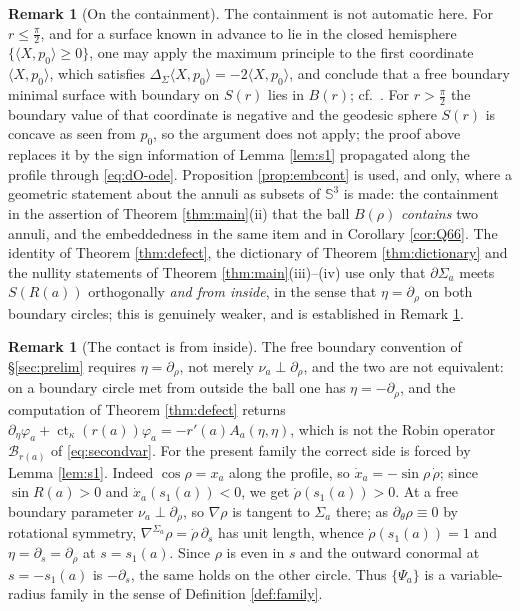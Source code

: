 \documentclass[11pt,a4paper]{amsart}
\theoremstyle{plain}
\theoremstyle{definition}
\newtheorem{remark}[theorem]{Remark}
\newcommand{\Sph}{\mathbb{S}}
\newcommand{\ct}{\operatorname{ct}_\kappa}
\begin{document}
\begin{remark}[On the containment]\label{rem:constrained}
The containment is not automatic here. For $r\leq\tfrac\pi2$, and for a surface known in advance to lie in the closed
hemisphere $\{\langle X,p_0\rangle\geq 0\}$, one may apply the maximum principle to the first coordinate $\langle X,p_0\rangle$, which satisfies $\Delta_{\Sigma}\langle X,p_0\rangle=-2\langle X,p_0\rangle$, and conclude that
a free boundary minimal surface with boundary on $S(r)$ lies in $B(r)$; cf.\ \cite[Rem. 2.3]{NZ1}. For $r>\tfrac\pi2$ the boundary value of that coordinate is negative and the geodesic sphere $S(r)$ is concave as seen from $p_0$, so the argument does not apply; the proof above replaces it by the sign information of Lemma \ref{lem:s1} propagated along the profile through \eqref{eq:dO-ode}. Proposition \ref{prop:embcont} is used, and only, where a geometric statement about the annuli as subsets of $\Sph^3$ is made: the containment in the assertion of Theorem \ref{thm:main}(ii) that the ball $B(\rho)$ \emph{contains} two annuli, and the embeddedness in the same item and in Corollary \ref{cor:Q66}. The identity of Theorem \ref{thm:defect}, the dictionary of Theorem \ref{thm:dictionary} and the nullity statements of Theorem \ref{thm:main}(iii)--(iv) use only that $\partial\Sigma_a$ meets $S(R(a))$ orthogonally \emph{and from inside}, in the sense that $\eta=\partial_\rho$ on both boundary circles; this is genuinely weaker, and is established in Remark \ref{rem:side}.
\end{remark}

\begin{remark}[The contact is from inside]\label{rem:side}
The free boundary convention of \S\ref{sec:prelim} requires $\eta=\partial_\rho$, not merely $\nu_a\perp\partial_\rho$, and the two are not equivalent: on a boundary circle met from outside the ball one has $\eta=-\partial_\rho$, and the computation of Theorem \ref{thm:defect} returns $\partial_\eta\varphi_a+\ct(r(a))\varphi_a=-r'(a)A_a(\eta,\eta)$, which is not the Robin operator $\mathcal{B}_{r(a)}$ of \eqref{eq:secondvar}. For the present family the correct side is forced by Lemma \ref{lem:s1}. Indeed $\cos\rho=x_a$ along the profile, so $\dot x_a=-\sin\rho\,\dot\rho$; since $\sin R(a)>0$ and $\dot x_a(s_1(a))<0$, we get $\dot\rho(s_1(a))>0$. At a free boundary parameter $\nu_a\perp\partial_\rho$, so $\nabla\rho$ is tangent to $\Sigma_a$ there; as $\partial_\theta\rho\equiv 0$ by rotational symmetry, $\nabla^{\Sigma_a}\rho=\dot\rho\,\partial_s$ has unit length, whence $\dot\rho(s_1(a))=1$ and $\eta=\partial_s=\partial_\rho$ at $s=s_1(a)$. Since $\rho$ is even in $s$ and the outward conormal at $s=-s_1(a)$ is $-\partial_s$, the same holds on the other circle. Thus $\{\Psi_a\}$ is a variable-radius family in the sense of Definition \ref{def:family}.
\end{remark}
\end{document}

